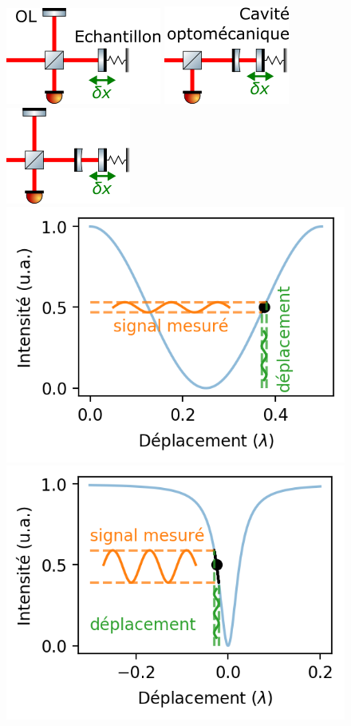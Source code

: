 \documentclass[12pt,a4paper]{article}
\begin{document}
\begin{figure}
\center
\includegraphics[scale=0.8]{figures/michelson_scheme.png} \hfill
\includegraphics[scale=0.8]{figures/cavity_intensity_scheme.png}\hfill
\includegraphics[scale=0.8]{figures/cavity_phase_scheme.png}
\includegraphics[scale=0.75]{figures/michelson_response.png}
\includegraphics[scale=0.75]{figures/cavity_intensity_response.png}

\end{figure}
\end{document}
